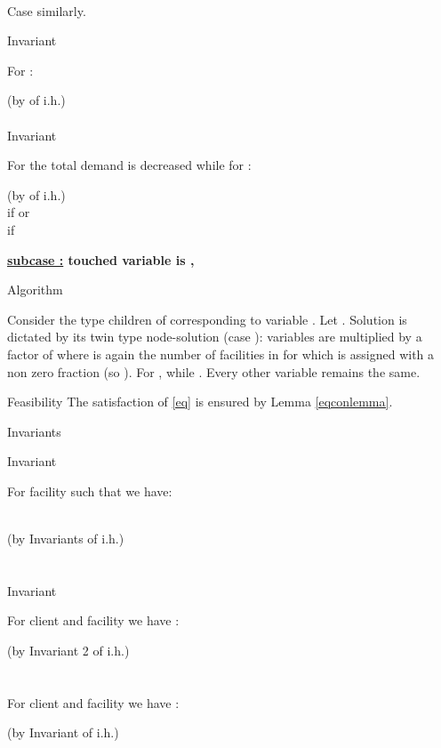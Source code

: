 \documentclass[11pt]{article}\usepackage{amsmath}
\begin{document}
\noindent

\\


Case  similarly.

{\sf Invariant }

For :

\noindent
 \hfill (by  of i.h.)\\
\\

{\sf Invariant }

For  the total demand is decreased while for :

\noindent
 \hfill (by  of i.h.)\\
\hfill  if   or \\
\hfill if \\ 






\medskip 

\noindent
{\bf \underline{subcase :} touched variable is  , }

{\sc Algorithm}

Consider the type  children  of  corresponding to variable .
Let . Solution  is dictated by its twin type  node-solution (case ):
variables  are multiplied by a
factor of  where 
  is again the number of
facilities in  for which  is assigned with a non zero fraction (so ).
 For ,  while . Every other variable remains the same.


{\sc Feasibility}
The satisfaction of \eqref{eq} is ensured by Lemma \ref{eqconlemma}.

{\sc Invariants}

{\sf Invariant }

For  facility  such that  we have:

 \noindent
\\
\hfill (by Invariants   of i.h.) \\
\\
\\

{\sf Invariant }

For client  and facility  we have :

\noindent
 \hfill (by Invariant 2 of i.h.)\\
\\
\\

For client  and facility  we have :

\noindent
\hfill (by Invariant  of i.h.)\\
\\
\\
\end{document}
